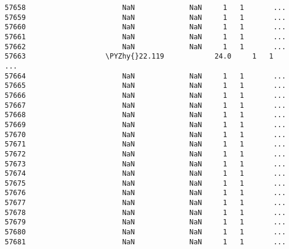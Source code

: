 \documentclass[a4paper,11pt,final]{article}
\def\PYZhy{\char`\-}
\begin{document}
\begin{Verbatim}[commandchars=\\\{\},frame=leftline,fontsize=\small, xleftmargin=0.5em]
57658                       NaN             NaN     1   1       ...
57659                       NaN             NaN     1   1       ...
57660                       NaN             NaN     1   1       ...
57661                       NaN             NaN     1   1       ...
57662                       NaN             NaN     1   1       ...
57663                   \PYZhy{}22.119            24.0     1   1       ...
57664                       NaN             NaN     1   1       ...
57665                       NaN             NaN     1   1       ...
57666                       NaN             NaN     1   1       ...
57667                       NaN             NaN     1   1       ...
57668                       NaN             NaN     1   1       ...
57669                       NaN             NaN     1   1       ...
57670                       NaN             NaN     1   1       ...
57671                       NaN             NaN     1   1       ...
57672                       NaN             NaN     1   1       ...
57673                       NaN             NaN     1   1       ...
57674                       NaN             NaN     1   1       ...
57675                       NaN             NaN     1   1       ...
57676                       NaN             NaN     1   1       ...
57677                       NaN             NaN     1   1       ...
57678                       NaN             NaN     1   1       ...
57679                       NaN             NaN     1   1       ...
57680                       NaN             NaN     1   1       ...
57681                       NaN             NaN     1   1       ...


\end{Verbatim}
\end{document}
